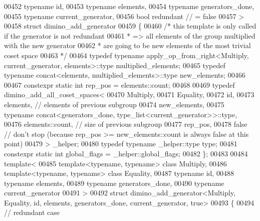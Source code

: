 \begin{DoxyCode}
00452   \textcolor{keyword}{typename} id,
00453   \textcolor{keyword}{typename} elements,
00454   \textcolor{keyword}{typename} generators\_done,
00455   \textcolor{keyword}{typename} current\_generator,
00456   \textcolor{keywordtype}{bool} redundant          \textcolor{comment}{// = false}
00457 >
00458 \textcolor{keyword}{struct }dimino\_add\_generator
00459 \{
00460   \textcolor{comment}{/* this template is only called if the generator is not redundant}
00461 \textcolor{comment}{   * => all elements of the group multiplied with the new generator}
00462 \textcolor{comment}{   *    are going to be new elements of the most trivial coset space}
00463 \textcolor{comment}{   */}
00464   \textcolor{keyword}{typedef} \textcolor{keyword}{typename} apply\_op\_from\_right<Multiply, current\_generator, elements>::type multiplied\_elements;
00465   \textcolor{keyword}{typedef} \textcolor{keyword}{typename} concat<elements, multiplied\_elements>::type new\_elements;
00466 
00467   constexpr \textcolor{keyword}{static} \textcolor{keywordtype}{int} rep\_pos = elements::count;
00468 
00469   \textcolor{keyword}{typedef} dimino\_add\_all\_coset\_spaces<
00470     Multiply,
00471     Equality,
00472     id,
00473     elements, \textcolor{comment}{// elements of previous subgroup}
00474     new\_elements,
00475     \textcolor{keyword}{typename} concat<generators\_done, type\_list<current\_generator>>::type,
00476     elements::count, \textcolor{comment}{// size of previous subgroup}
00477     rep\_pos,
00478     \textcolor{keyword}{false} \textcolor{comment}{// don't stop (because rep\_pos >= new\_elements::count is always false at this point)}
00479   > \_helper;
00480   \textcolor{keyword}{typedef} \textcolor{keyword}{typename} \_helper::type type;
00481   constexpr \textcolor{keyword}{static} \textcolor{keywordtype}{int} global\_flags = \_helper::global\_flags;
00482 \};
00483 
00484 \textcolor{keyword}{template}<
00485   \textcolor{keyword}{template}<\textcolor{keyword}{typename}, \textcolor{keyword}{typename}> \textcolor{keyword}{class }Multiply,
00486   \textcolor{keyword}{template}<\textcolor{keyword}{typename}, \textcolor{keyword}{typename}> \textcolor{keyword}{class }Equality,
00487   \textcolor{keyword}{typename} id,
00488   \textcolor{keyword}{typename} elements,
00489   \textcolor{keyword}{typename} generators\_done,
00490   \textcolor{keyword}{typename} current\_generator
00491 >
00492 \textcolor{keyword}{struct }dimino\_add\_generator<Multiply, Equality, id, elements, generators\_done, current\_generator, true>
00493 \{
00494   \textcolor{comment}{// redundant case}

\end{DoxyCode}
